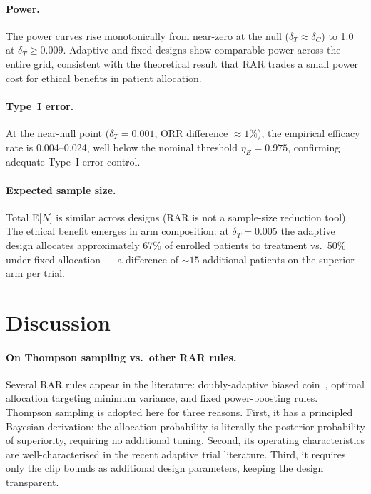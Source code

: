 \documentclass[11pt,a4paper]{article}
\newcommand{\etaE}{\eta_E}
\begin{document}
\paragraph{Power.} The power curves rise monotonically from near-zero at the
null ($\delta_T \approx \delta_C$) to 1.0 at $\delta_T \geq 0.009$. Adaptive
and fixed designs show comparable power across the entire grid, consistent with
the theoretical result that RAR trades a small power cost for ethical benefits
in patient allocation.
 
\paragraph{Type~I error.} At the near-null point ($\delta_T = 0.001$,
ORR difference $\approx 1\%$), the empirical efficacy rate is 0.004--0.024,
well below the nominal threshold $\etaE = 0.975$, confirming adequate Type~I
error control.
 
\paragraph{Expected sample size.} Total E[$N$] is similar across designs
(RAR is not a sample-size reduction tool). The ethical benefit emerges in arm
composition: at $\delta_T = 0.005$ the adaptive design allocates approximately
67\% of enrolled patients to treatment vs.\ 50\% under fixed allocation ---
a difference of $\sim 15$ additional patients on the superior arm per trial.
 
\section{Discussion}
 
\paragraph{On Thompson sampling vs.\ other RAR rules.}
Several RAR rules appear in the literature: doubly-adaptive biased coin~\cite{Hu2004},
optimal allocation targeting minimum variance, and fixed power-boosting rules.
Thompson sampling is adopted here for three reasons. First, it has a principled
Bayesian derivation: the allocation probability is literally the posterior
probability of superiority, requiring no additional tuning. Second, its
operating characteristics are well-characterised in the recent adaptive trial
literature. Third, it requires only the clip bounds as additional design
parameters, keeping the design transparent.
 
\end{document}
